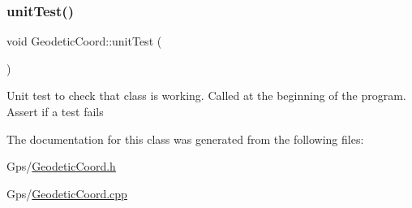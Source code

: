 \subsubsection{\texorpdfstring{unit\+Test()}{unitTest()}}
{\footnotesize\ttfamily void Geodetic\+Coord\+::unit\+Test (\begin{DoxyParamCaption}{ }\end{DoxyParamCaption})\hspace{0.3cm}{\ttfamily [static]}}

Unit test to check that class is working. Called at the beginning of the program. Assert if a test fails 

The documentation for this class was generated from the following files\+:\begin{DoxyCompactItemize}
\item 
Gps/\mbox{\hyperlink{_geodetic_coord_8h}{Geodetic\+Coord.\+h}}\item 
Gps/\mbox{\hyperlink{_geodetic_coord_8cpp}{Geodetic\+Coord.\+cpp}}\end{DoxyCompactItemize}
